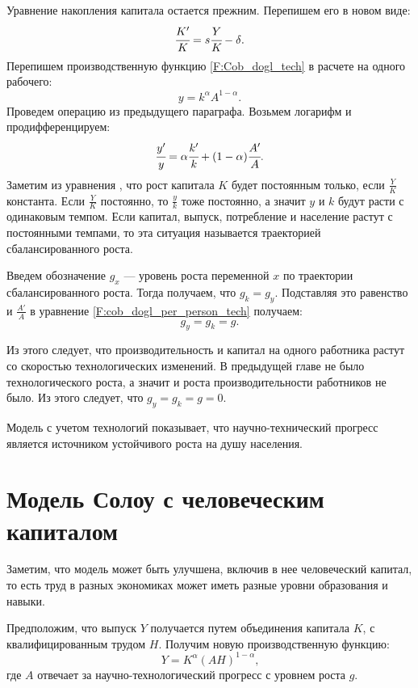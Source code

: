 Уравнение накопления капитала остается прежним. Перепишем его в новом виде:
\begin{equation}
\cfrac{K'}{K} = s \cfrac{Y}{K} - \delta\text{.}
\label{F:capital_solow_tech}
\end{equation}
Перепишем производственную функцию \ref{F:Cob_dogl_tech} в расчете на одного рабочего:
\begin{equation*}
y=k^{\alpha}A^{1 - \alpha}\text{.}
\end{equation*}
Проведем операцию из предыдущего параграфа.
Возьмем логарифм и продифференцируем:
\begin{equation}
\cfrac{y'}{y} = \alpha \cfrac{k'}{k} + (1 - \alpha) \cfrac{A'}{A}\text{.}
\label{F:cob_dogl_per_person_tech}
\end{equation}
Заметим из уравнения \label{F:capital_solow_tech}, что рост капитала $K$ будет постоянным только, если $\frac{Y}{K}$ константа.
Если $\frac{Y}{K}$ постоянно, то $\frac{y}{k}$ тоже постоянно, а значит $y$ и $k$ будут расти с одинаковым темпом.
Если капитал, выпуск, потребление и население растут с постоянными темпами, то эта ситуация называется траекторией сбалансированного роста.

Введем обозначение $g_{x}$ --- уровень роста переменной $x$ по траектории сбалансированного роста.
Тогда получаем, что $g_{k} = g_{y}$. Подставляя это равенство и $\frac{A'}{A}$ в уравнение \ref{F:cob_dogl_per_person_tech} получаем:
\begin{equation*}
g_{y} = g_{k}=g\text{.}
\end{equation*}

Из этого следует, что производительность и капитал на одного работника растут со скоростью технологических изменений.
В предыдущей главе не было технологического роста, а значит и роста производительности работников не было.
Из этого следует, что $g_{y}=g_{k}=g=0$.

Модель с учетом технологий показывает, что научно-технический прогресс является источником устойчивого роста на душу населения.

\section{Модель Солоу с человеческим капиталом}

Заметим, что модель может быть улучшена, включив в нее человеческий капитал, то есть труд в разных экономиках может иметь разные уровни образования и навыки.

Предположим, что выпуск $Y$ получается путем объединения капитала $K$, с квалифицированным трудом $H$.
Получим новую производственную функцию:
\begin{equation}
Y=K^{\alpha}(AH)^{1-\alpha}\text{,}
\end{equation}
где $A$ отвечает за научно-технологический прогресс с уровнем роста $g$.

